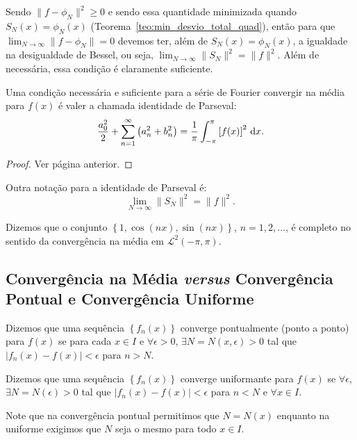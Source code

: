 Sendo $\| f - \phi_N \|^2 \geq 0$ e sendo essa quantidade minimizada quando
$S_N(x) = \phi_N(x)$ (Teorema~\ref{teo:min_desvio_total_quad}), então para que
$\lim_{N \to \infty} \| f - \phi_N \| = 0$ devemos ter, além de $S_N(x) =
\phi_N(x)$, a igualdade na desigualdade de Bessel, ou seja, $\lim_{N \to \infty}
\| S_N \|^2 = \| f \|^2$. Além de necessária, essa condição é claramente
suficiente.

\begin{teo}
  Uma condição necessária e suficiente para a série de Fourier convergir na
  média para $f(x)$ é valer a chamada identidade de Parseval:
  \begin{dmath*}
    \frac{a_0^2}{2} + \sum_{n = 1}^\infty \left( a_n^2 + b_n^2 \right) =
    \frac{1}{\pi} \int_{-\pi}^\pi \left[ f(x) \right]^2 \vi{x}.
  \end{dmath*}
\end{teo}
\begin{proof}
  Ver página anterior.
\end{proof}

Outra notação para a identidade de Parseval é:
\begin{dmath*}
  \lim_{N \to \infty} \| S_N \|^2 = \| f \|^2.
\end{dmath*}

\begin{obs}
  Dizemos que o conjunto $\left\{ 1, \cos\left( n x \right), \sin\left( n x
  \right) \right\}$, $n = 1, 2, \ldots$, é completo no sentido da convergência
  na média em $\mathcal{L}^2(-\pi, \pi)$.
\end{obs}

\subsection{Convergência na Média \textit{versus} Convergência Pontual e
Convergência Uniforme}
Dizemos que uma sequência $\left\{ f_n(x) \right\}$ converge pontualmente (ponto
a ponto) para $f(x)$ se para cada $x \in I$ e $\forall \epsilon > 0$, $\exists N
= N(x, \epsilon) > 0$ tal que $| f_n(x) - f(x) | < \epsilon$ para $n > N$.

Dizemos que uma sequência $\left\{ f_n(x) \right\}$ converge uniformante para
$f(x)$ se $\forall \epsilon$, $\exists N = N(\epsilon) > 0$ tal que $| f_n(x) -
f(x) | < \epsilon$ para $n < N$ e $\forall x \in I$.

\begin{obs}
  Note que na convergência pontual permitimos que $N = N(x)$ enquanto na
  uniforme exigimos que $N$ seja o mesmo para todo $x \in I$.
\end{obs}

